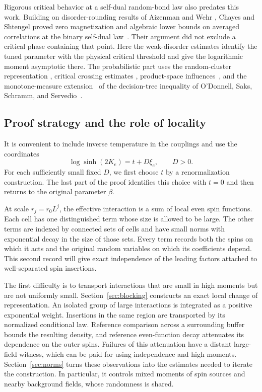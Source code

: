 Rigorous critical behavior at a self-dual random-bond law also predates
this work. Building on disorder-rounding results of Aizenman and Wehr
\cite{AizenmanWehr1990}, Chayes and Shtengel proved zero magnetization
and algebraic lower bounds on averaged correlations at the binary
self-dual law~\cite[Theorems~1$'$ and~2$'$]{ChayesShtengel1999}. Their
argument did not exclude a critical phase containing that point. Here
the weak-disorder estimates identify the tuned parameter with the
physical critical threshold and give the logarithmic moment asymptotic
there. The probabilistic part uses the random-cluster representation
\cite{FK1972,EdwardsSokal1988}, critical crossing estimates
\cite{DHN2011,CDH2016}, product-space influences~\cite{GJN2013}, and the
monotone-measure extension~\cite{DCRT2019} of the decision-tree inequality
of O'Donnell, Saks, Schramm, and Servedio~\cite{OSSS2005}.

\subsection{Proof strategy and the role of locality}

It is convenient to include inverse temperature in the couplings and use
the coordinates
\begin{equation}\label{eq:model-td}
 \log\sinh(2K_e)=t+D\xi_e,\qquad D>0.
\end{equation}
For each sufficiently small fixed $D$, we first choose $t$ by a
renormalization construction. The last part of the proof identifies this
choice with $t=0$ and then returns to the original parameter $\beta$.

At scale $r_j=r_0L^j$, the effective interaction is a sum of local even
spin functions. Each cell has one distinguished term whose size is allowed
to be large. The other terms are indexed by connected sets of cells and
have small norms with exponential decay in the size of those sets. Every
term records both the spins on which it acts and the original random
variables on which its coefficients depend. This second record will give
exact independence of the leading factors attached to well-separated
spin insertions.

The first difficulty is to transport interactions that are small in high
moments but are not uniformly small. Section~\ref{sec:blocking} constructs
an exact local change of representation. An isolated group of large
interactions is integrated as a positive exponential weight. Insertions
in the same region are transported by its normalized conditional law.
Reference comparison across a surrounding buffer bounds the resulting
density, and reference even-function decay attenuates its dependence on
the outer spins. Failures of this attenuation have a distant large-field
witness, which can be paid for using independence and high moments.
Section~\ref{sec:norms} turns these observations into the estimates needed
to iterate the construction. In particular, it controls mixed moments of
spin sources and nearby background fields, whose randomness is shared.

